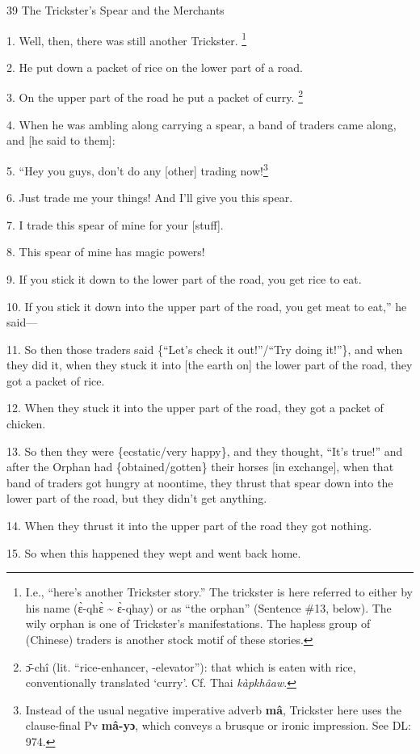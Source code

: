 
39 The Trickster's Spear and the Merchants

1. Well, then, there was still another Trickster. \footnote{I.e., ``here's another Trickster story.'' The trickster is here referred to either by his name (ɛ̀-qhɛ̀ \textasciitilde{} ɛ̀-qhay) or as ``the orphan'' (Sentence \#13, below). The wily orphan is one of Trickster's manifestations. The hapless group of (Chinese) traders is another stock motif of these stories.}

2. He put down a packet of rice on the lower part of a road.

3. On the upper part of the road he put a packet of curry. \footnote{ɔ̄-chî (lit. ``rice-enhancer, -elevator''): that which is eaten with rice, conventionally translated `curry'. Cf. Thai \textit{kàpkhâaw}.}

4. When he was ambling along carrying a spear, a band of traders came along, and
[he said to them]:

5. ``Hey you guys, don't do any [other] trading now!\footnote{Instead of the usual negative imperative adverb \textbf{mâ}, Trickster here uses the clause-final Pv \textbf{mâ-yɔ}, which conveys a brusque or ironic impression. See DL: 974.}

6. Just trade me your things! And I'll give you this spear.

7. I trade this spear of mine for your [stuff].

8. This spear of mine has magic powers!

9. If you stick it down to the lower part of the road, you get rice to eat.

10. If you stick it down into the upper part of the road, you get meat to eat,''
he said---

11. So then those traders said \{``Let's check it out!''/``Try doing it!''\}, and
when they did it, when they stuck it into [the earth on] the lower part of the
road, they got a packet of rice.

12. When they stuck it into the upper part of the road, they got a packet of chicken.

13. So then they were \{ecstatic/very happy\}, and they thought, ``It's true!''
and after the Orphan had \{obtained/gotten\} their horses [in exchange], when that
band of traders got hungry at noontime, they thrust that spear down into the lower
part of the road, but they didn't get anything.

14. When they thrust it into the upper part of the road they got nothing.

15. So when this happened they wept and went back home.

